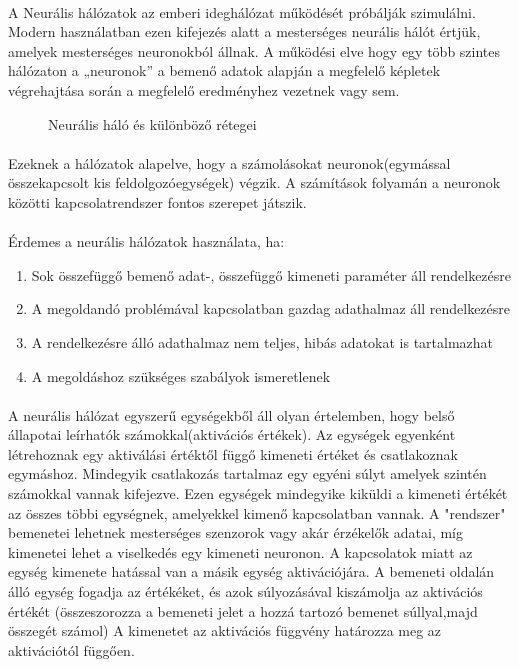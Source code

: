 \paragraph{}
A Neurális hálózatok az emberi ideghálózat működését próbálják szimulálni. Modern használatban ezen kifejezés alatt a mesterséges neurális hálót értjük, amelyek mesterséges neuronokból állnak. A működési elve hogy egy több szintes hálózaton a „neuronok” a bemenő adatok alapján a megfelelő képletek végrehajtása során a megfelelő eredményhez vezetnek vagy sem. 

\begin{figure}[t]
  \centering
  \caption[Egyszerű neurális háló]%
  {Neurális háló és különböző rétegei}
  \label{fig:ALAP:sm1}
\end{figure}

\paragraph{} 
Ezeknek a hálózatok alapelve, hogy a számolásokat neuronok(egymással összekapcsolt kis feldolgozóegységek) végzik. A számítások folyamán a neuronok közötti kapcsolatrendszer fontos szerepet játszik.

\paragraph{}
Érdemes a neurális hálózatok használata, ha:
\begin{enumerate}
	\item Sok összefüggő bemenő adat-, összefüggő kimeneti paraméter áll rendelkezésre
	\item A megoldandó problémával kapcsolatban gazdag adathalmaz áll rendelkezésre
	\item A rendelkezésre álló adathalmaz nem teljes, hibás adatokat is tartalmazhat
	\item A megoldáshoz szükséges szabályok ismeretlenek 
\end{enumerate}

\paragraph{}
A neurális hálózat egyszerű egységekből áll olyan értelemben, hogy belső állapotai leírhatók számokkal(aktivációs értékek). Az egységek egyenként létrehoznak egy aktiválási értéktől függő kimeneti értéket és csatlakoznak egymáshoz. Mindegyik csatlakozás tartalmaz egy egyéni súlyt amelyek szintén számokkal vannak kifejezve. Ezen egységek mindegyike kiküldi a kimeneti értékét az összes többi egységnek, amelyekkel kimenő kapcsolatban vannak. A "rendszer" bemenetei lehetnek mesterséges szenzorok vagy akár érzékelők adatai, míg kimenetei lehet a viselkedés egy kimeneti neuronon. A kapcsolatok miatt az egység kimenete hatással van a másik egység aktivációjára. A bemeneti oldalán álló egység fogadja az értékéket, és azok súlyozásával kiszámolja az aktivációs értékét (összeszorozza a bemeneti jelet a hozzá tartozó bemenet súllyal,majd összegét számol) A kimenetet az aktivációs függvény határozza meg az aktivációtól függően.

